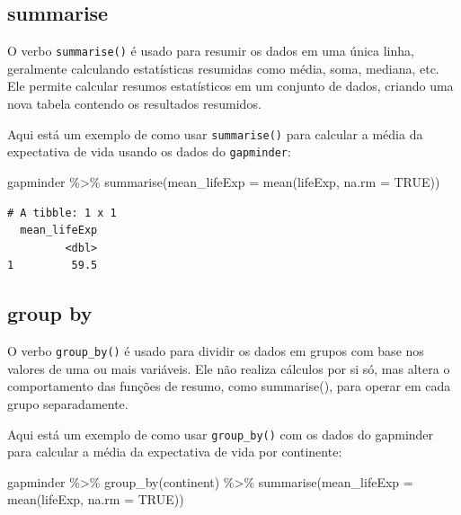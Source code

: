 \documentclass[
  portuguese,
  letterpaper,
  DIV=11,
  numbers=noendperiod]{scrreprt}
\newenvironment{Shaded}{\begin{snugshade}}{\end{snugshade}}
\newcommand{\AttributeTok}[1]{\textcolor[rgb]{0.40,0.45,0.13}{#1}}
\newcommand{\ConstantTok}[1]{\textcolor[rgb]{0.56,0.35,0.01}{#1}}
\newcommand{\FunctionTok}[1]{\textcolor[rgb]{0.28,0.35,0.67}{#1}}
\newcommand{\NormalTok}[1]{\textcolor[rgb]{0.00,0.23,0.31}{#1}}
\newcommand{\SpecialCharTok}[1]{\textcolor[rgb]{0.37,0.37,0.37}{#1}}
\theoremstyle{definition}
\theoremstyle{remark}
\begin{document}
\subsection{summarise}\label{summarise}

O verbo \texttt{summarise()} é usado para resumir os dados em uma única
linha, geralmente calculando estatísticas resumidas como média, soma,
mediana, etc. Ele permite calcular resumos estatísticos em um conjunto
de dados, criando uma nova tabela contendo os resultados resumidos.

Aqui está um exemplo de como usar \texttt{summarise()} para calcular a
média da expectativa de vida usando os dados do \texttt{gapminder}:

\begin{Shaded}
\begin{Highlighting}[]
\NormalTok{gapminder }\SpecialCharTok{\%\textgreater{}\%}
  \FunctionTok{summarise}\NormalTok{(}\AttributeTok{mean\_lifeExp =} \FunctionTok{mean}\NormalTok{(lifeExp, }\AttributeTok{na.rm =} \ConstantTok{TRUE}\NormalTok{))}
\end{Highlighting}
\end{Shaded}

\begin{verbatim}
# A tibble: 1 x 1
  mean_lifeExp
         <dbl>
1         59.5
\end{verbatim}

\subsection{group by}\label{sec-dados-groupby}

O verbo \texttt{group\_by()} é usado para dividir os dados em grupos com
base nos valores de uma ou mais variáveis. Ele não realiza cálculos por
si só, mas altera o comportamento das funções de resumo, como
summarise(), para operar em cada grupo separadamente.

Aqui está um exemplo de como usar \texttt{group\_by()} com os dados do
gapminder para calcular a média da expectativa de vida por continente:

\begin{Shaded}
\begin{Highlighting}[]
\NormalTok{gapminder }\SpecialCharTok{\%\textgreater{}\%}
  \FunctionTok{group\_by}\NormalTok{(continent) }\SpecialCharTok{\%\textgreater{}\%}
  \FunctionTok{summarise}\NormalTok{(}\AttributeTok{mean\_lifeExp =} \FunctionTok{mean}\NormalTok{(lifeExp, }\AttributeTok{na.rm =} \ConstantTok{TRUE}\NormalTok{))}
\end{Highlighting}
\end{Shaded}
\end{document}
